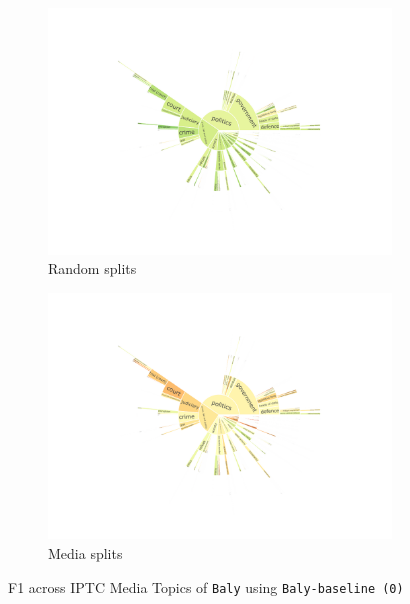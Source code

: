 \begin{figure}[!htbp]
    \centering
	\begin{subfigure}{\textwidth}
            \centering
    \includegraphics[trim={2.2cm 2cm 2.2cm 2cm},clip,width=\linewidth]{figures/baly_iptc_weighted_f1_random_bert.pdf}
    \caption{Random splits}
    \label{fig:baly_iptc_weighted_f1_random_bert}
\end{subfigure}
\begin{subfigure}{\textwidth}
            \centering
    \includegraphics[trim={2.2cm 2cm 2.2cm 2cm},clip,width=\linewidth]{figures/baly_iptc_weighted_f1_media_bert.pdf}
    \caption{Media splits}
    \label{fig:baly_iptc_weighted_f1_media_bert}
\end{subfigure}
\caption{F1 across IPTC Media Topics of \texttt{Baly} using \texttt{Baly-baseline (0)}}
    \label{fig:baly_iptc_weighted_f1_bert}
\end{figure}

